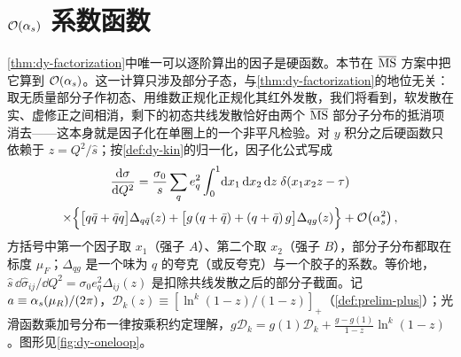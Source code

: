 \section{\texorpdfstring{$\mathcal{O}\!\left(\alpha_s\right)$}{O(alpha_s)} 系数函数}\label{sec:dy-nlo}

\cref{thm:dy-factorization}中唯一可以逐阶算出的因子是硬函数。本节在 $\overline{\mathrm{MS}}$ 方案中把它算到 $\mathcal{O}\!\left(\alpha_s\right)$。这一计算只涉及部分子态，与\cref{thm:dy-factorization}的地位无关：取无质量部分子作初态、用维数正规化正规化其红外发散，我们将看到，软发散在实、虚修正之间相消，剩下的初态共线发散恰好由两个 $\overline{\mathrm{MS}}$ 部分子分布的抵消项消去——这本身就是因子化在单圈上的一个非平凡检验。对 $y$ 积分之后硬函数只依赖于 $z=Q^2/\hat s$；按\cref{def:dy-kin}的归一化，因子化公式写成
\begin{multline}\label{eq:dy-fact-nlo}
\frac{\mathrm{d}\sigma}{\mathrm{d} Q^2}=\frac{\sigma_0}{s}\sum_qe_q^2\int_0^1\!\mathrm{d} x_1\,\mathrm{d} x_2\,\mathrm{d} z\;\delta(x_1x_2z-\tau)\\
\times\Big\{\big[q\bar q+\bar qq\big]\Delta_{q\bar q}(z)+\big[g\,(q+\bar q)+(q+\bar q)\,g\big]\Delta_{qg}(z)\Big\}+\mathcal{O}\!\left(\alpha_s^2\right),
\end{multline}
方括号中第一个因子取 $x_1$（强子 $A$）、第二个取 $x_2$（强子 $B$），部分子分布都取在标度 $\mu_F$；$\Delta_{qg}$ 是一个味为 $q$ 的夸克（或反夸克）与一个胶子的系数。等价地，$\hat s\,\dd\hat\sigma_{ij}/\dd Q^2=\sigma_0e_q^2\Delta_{ij}(z)$ 是扣除共线发散之后的部分子截面。记 $a\equiv\alpha_s(\mu_R)/(2\pi)$，$\mathcal D_k(z)\equiv[\ln^k(1-z)/(1-z)]_+$（\cref{def:prelim-plus}）；光滑函数乘加号分布一律按乘积约定理解，$g\mathcal D_k=g(1)\mathcal D_k+\frac{g-g(1)}{1-z}\ln^k(1-z)$。图形见\cref{fig:dy-oneloop}。

